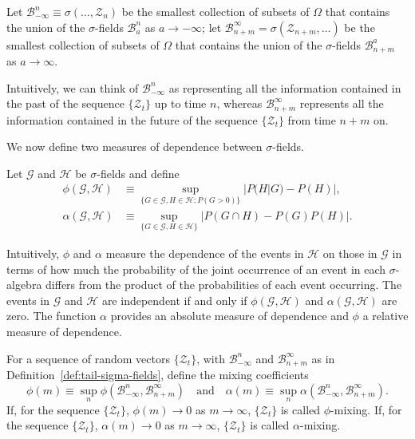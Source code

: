 \begin{definition}\label{def:tail-sigma-fields}
Let $\mathcal{B}_{-\infty}^n \equiv \sigma(\ldots, \boldsymbol{\mathcal{Z}}_n)$ be the smallest collection of subsets of $\Omega$ that contains the union of the $\sigma$-fields $\mathcal{B}_a^n$ as $a \to -\infty$; let $\mathcal{B}_{n+m}^{\infty} = \sigma(\boldsymbol{\mathcal{Z}}_{n+m}, \ldots)$ be the smallest collection of subsets of $\Omega$ that contains the union of the $\sigma$-fields $\mathcal{B}_{n+m}^{a}$ as $a \to \infty$.
\end{definition}

Intuitively, we can think of $\mathcal{B}_{-\infty}^n$ as representing all the information contained in the past of the sequence $\{\boldsymbol{\mathcal{Z}}_t\}$ up to time $n$, whereas $\mathcal{B}_{n+m}^{\infty}$ represents all the information contained in the future of the sequence $\{\boldsymbol{\mathcal{Z}}_t\}$ from time $n + m$ on.

We now define two measures of dependence between $\sigma$-fields.

\begin{definition}\label{def:dependence-measures}
Let $\mathcal{G}$ and $\mathcal{H}$ be $\sigma$-fields and define
\begin{align*}
\phi(\mathcal{G}, \mathcal{H}) &\equiv \sup_{\{G \in \mathcal{G}, H \in \mathcal{H}: P(G > 0)\}} |P(H|G) - P(H)|, \\
\alpha(\mathcal{G}, \mathcal{H}) &\equiv \sup_{\{G \in \mathcal{G}, H \in \mathcal{H}\}} |P(G \cap H) - P(G)P(H)|.
\end{align*}
\end{definition}

Intuitively, $\phi$ and $\alpha$ measure the dependence of the events in $\mathcal{H}$ on those in $\mathcal{G}$ in terms of how much the probability of the joint occurrence of an event in each $\sigma$-algebra differs from the product of the probabilities of each event occurring. The events in $\mathcal{G}$ and $\mathcal{H}$ are independent if and only if $\phi(\mathcal{G}, \mathcal{H})$ and $\alpha(\mathcal{G}, \mathcal{H})$ are zero. The function $\alpha$ provides an absolute measure of dependence and $\phi$ a relative measure of dependence.

\begin{definition}\label{def:mixing-coefficients}
For a sequence of random vectors $\{\boldsymbol{\mathcal{Z}}_t\}$, with $\mathcal{B}_{-\infty}^n$ and $\mathcal{B}_{n+m}^{\infty}$ as in Definition~\ref{def:tail-sigma-fields}, define the mixing coefficients
\[
\phi(m) \equiv \sup_n \phi(\mathcal{B}_{-\infty}^n, \mathcal{B}_{n+m}^{\infty}) \quad \text{and} \quad \alpha(m) \equiv \sup_n \alpha(\mathcal{B}_{-\infty}^n, \mathcal{B}_{n+m}^{\infty}).
\]
If, for the sequence $\{\boldsymbol{\mathcal{Z}}_t\}$, $\phi(m) \to 0$ as $m \to \infty$, $\{\boldsymbol{\mathcal{Z}}_t\}$ is called $\phi$-mixing. If, for the sequence $\{\boldsymbol{\mathcal{Z}}_t\}$, $\alpha(m) \to 0$ as $m \to \infty$, $\{\boldsymbol{\mathcal{Z}}_t\}$ is called $\alpha$-mixing.
\end{definition}

